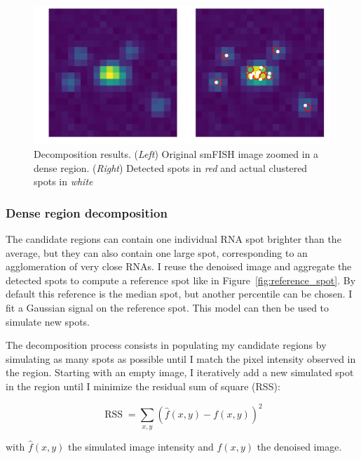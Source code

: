 \begin{figure}[]
    \centering
    \includegraphics[width=1\textwidth]{figures/chapter2/plot_dense_decomposition}
    \caption[Example of dense region decomposition]{Decomposition results.
	(\textit{Left}) Original smFISH image zoomed in a dense region.
	(\textit{Right}) Detected spots in \textit{red} and actual clustered spots in \textit{white}}
    \label{fig:dense_decomposition}
\end{figure}

\subsubsection{Dense region decomposition}

The candidate regions can contain one individual \ac{RNA} spot brighter than the average, but they can also contain one large spot, corresponding to an agglomeration of very close \ac{RNA}s.
I reuse the denoised image and aggregate the detected spots to compute a reference spot like in Figure~\ref{fig:reference_spot}.
By default this reference is the median spot, but another percentile can be chosen.
I fit a Gaussian signal on the reference spot.
This model can then be used to simulate new spots.

The decomposition process consists in populating my candidate regions by simulating as many spots as possible until I match the pixel intensity observed in the region.
Starting with an empty image, I iteratively add a new simulated spot in the region until I minimize the residual sum of square (RSS):

\begin{equation}
	{\displaystyle \operatorname{RSS} = \sum _{x, y}(\hat{f}(x, y) - f(x, y))^{2}}
\end{equation}

\noindent
with $\hat{f}(x, y)$ the simulated image intensity and $f(x, y)$ the denoised image.


